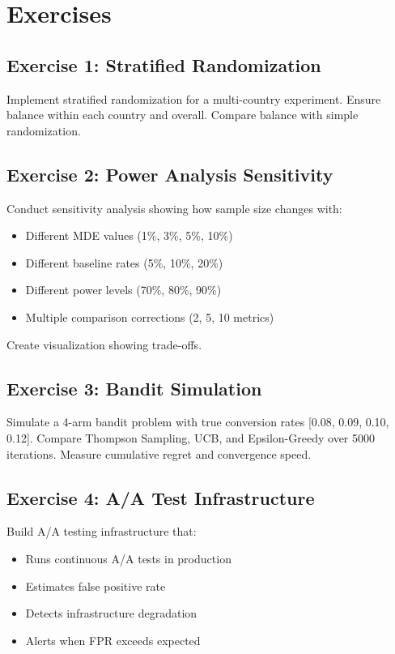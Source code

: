 \section{Exercises}

\subsection{Exercise 1: Stratified Randomization}

Implement stratified randomization for a multi-country experiment. Ensure balance within each country and overall. Compare balance with simple randomization.

\subsection{Exercise 2: Power Analysis Sensitivity}

Conduct sensitivity analysis showing how sample size changes with:
\begin{itemize}
    \item Different MDE values (1\%, 3\%, 5\%, 10\%)
    \item Different baseline rates (5\%, 10\%, 20\%)
    \item Different power levels (70\%, 80\%, 90\%)
    \item Multiple comparison corrections (2, 5, 10 metrics)
\end{itemize}

Create visualization showing trade-offs.

\subsection{Exercise 3: Bandit Simulation}

Simulate a 4-arm bandit problem with true conversion rates [0.08, 0.09, 0.10, 0.12]. Compare Thompson Sampling, UCB, and Epsilon-Greedy over 5000 iterations. Measure cumulative regret and convergence speed.

\subsection{Exercise 4: A/A Test Infrastructure}

Build A/A testing infrastructure that:
\begin{itemize}
    \item Runs continuous A/A tests in production
    \item Estimates false positive rate
    \item Detects infrastructure degradation
    \item Alerts when FPR exceeds expected
\end{itemize}

